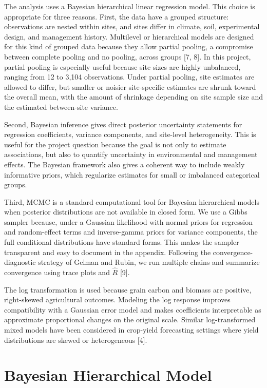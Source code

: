 \documentclass[11pt]{article}
\begin{document}
The analysis uses a Bayesian hierarchical linear regression model. This choice is appropriate for three reasons. First, the data have a grouped structure: observations are nested within sites, and sites differ in climate, soil, experimental design, and management history. Multilevel or hierarchical models are designed for this kind of grouped data because they allow partial pooling, a compromise between complete pooling and no pooling, across groups [7, 8]. In this project, partial pooling is especially useful because site sizes are highly unbalanced, ranging from 12 to 3,104 observations. Under partial pooling, site estimates are allowed to differ, but smaller or noisier site-specific estimates are shrunk toward the overall mean, with the amount of shrinkage depending on site sample size and the estimated between-site variance.

Second, Bayesian inference gives direct posterior uncertainty statements for regression coefficients, variance components, and site-level heterogeneity. This is useful for the project question because the goal is not only to estimate associations, but also to quantify uncertainty in environmental and management effects. The Bayesian framework also gives a coherent way to include weakly informative priors, which regularize estimates for small or imbalanced categorical groups.

Third, MCMC is a standard computational tool for Bayesian hierarchical models when posterior distributions are not available in closed form. We use a Gibbs sampler because, under a Gaussian likelihood with normal priors for regression and random-effect terms and inverse-gamma priors for variance components, the full conditional distributions have standard forms. This makes the sampler transparent and easy to document in the appendix. Following the convergence-diagnostic strategy of Gelman and Rubin, we run multiple chains and summarize convergence using trace plots and $\hat{R}$ [9].

The log transformation is used because grain carbon and biomass are positive, right-skewed agricultural outcomes. Modeling the log response improves compatibility with a Gaussian error model and makes coefficients interpretable as approximate proportional changes on the original scale. Similar log-transformed mixed models have been considered in crop-yield forecasting settings where yield distributions are skewed or heterogeneous [4].

\section{Bayesian Hierarchical Model}
\end{document}

